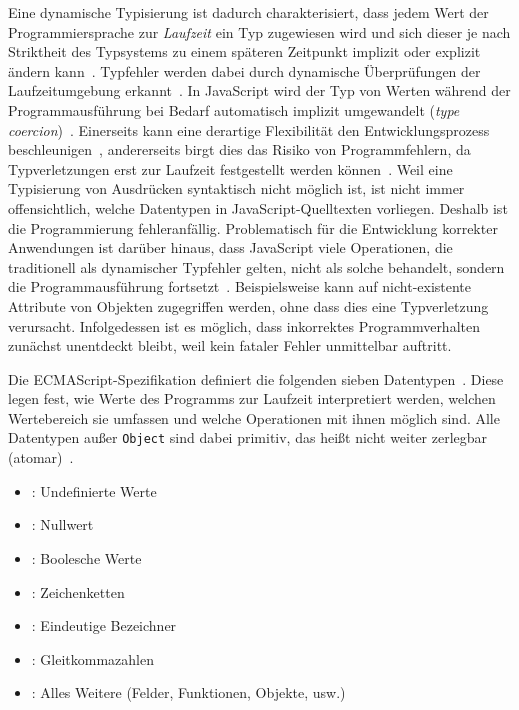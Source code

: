 Eine dynamische Typisierung ist dadurch charakterisiert, dass jedem Wert der Programmiersprache zur \emph{Laufzeit} ein Typ zugewiesen wird und sich dieser je nach Striktheit des Typsystems zu einem späteren Zeitpunkt implizit oder explizit ändern kann~\autocite[45]{WALDMANN:PPS}. Typfehler werden dabei durch dynamische Überprüfungen der Laufzeitumgebung erkannt~\autocite[37]{CARDELLI:TYPE_SYSTEMS}. In JavaScript wird der Typ von Werten während der Programmausführung bei Bedarf automatisch implizit umgewandelt (\emph{type coercion})~\autocite{RICHARDS:2010}. Einerseits kann eine derartige Flexibilität den Entwicklungsprozess beschleunigen~\autocite[1]{FLOW:PAPER}, andererseits birgt dies das Risiko von Programmfehlern, da Typverletzungen erst zur Laufzeit festgestellt werden können~\autocite{ANDERSON:2005}. Weil eine Typisierung von Ausdrücken syntaktisch nicht möglich ist, ist nicht immer offensichtlich, welche Datentypen in JavaScript-Quelltexten vorliegen. Deshalb ist die Programmierung fehleranfällig. Problematisch für die Entwicklung korrekter Anwendungen ist darüber hinaus, dass JavaScript viele Operationen, die traditionell als dynamischer Typfehler gelten, nicht als solche behandelt, sondern die Programmausführung fortsetzt~\autocite{NIKHIL:2014}. Beispielsweise kann auf nicht-existente Attribute von Objekten zugegriffen werden, ohne dass dies eine Typverletzung verursacht. Infolgedessen ist es möglich, dass inkorrektes Programmverhalten zunächst unentdeckt bleibt, weil kein fataler Fehler unmittelbar auftritt.

Die ECMAScript-Spezifikation definiert die folgenden sieben Datentypen~\autocite[25]{ECMASCRIPT:2019}. Diese legen fest, wie Werte des Programms zur Laufzeit interpretiert werden, welchen Wertebereich sie umfassen und welche Operationen mit ihnen möglich sind. Alle Datentypen außer \texttt{Object} sind dabei primitiv, das heißt nicht weiter zerlegbar (atomar)~\autocite[8]{ECMASCRIPT:2019}.

\begin{itemize}
  \item {}: Undefinierte Werte
  \item {}: Nullwert
  \item {}: Boolesche Werte
  \item {}: Zeichenketten
  \item {}: Eindeutige Bezeichner
  \item {}: Gleitkommazahlen
  \item {}: Alles Weitere (Felder, Funktionen, Objekte, usw.)
\end{itemize}

